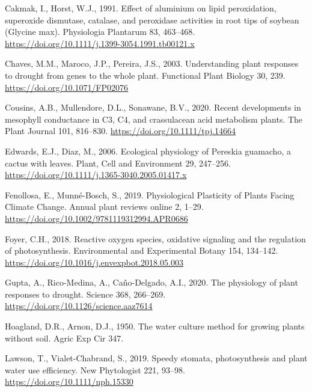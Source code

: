 \documentclass[
  12pt,
  letterpaper,
  DIV=11,
  numbers=noendperiod]{scrartcl}
\newlength{\cslhangindent}
\newlength{\cslentryspacingunit} %
\newenvironment{CSLReferences}[2] %
 {%
  \setlength{\parindent}{0pt}
  \ifodd #1
  \let\oldpar\par
  \def\par{\hangindent=\cslhangindent\oldpar}
  \fi
  \setlength{\parskip}{#2\cslentryspacingunit}
 }%
 {}
\begin{document}
\hypertarget{refs}{}
\begin{CSLReferences}{1}{0}
\leavevmode{}%
Cakmak, I., Horst, W.J., 1991. Effect of aluminium on lipid
peroxidation, superoxide dismutase, catalase, and peroxidase activities
in root tips of soybean ({Glycine} max). Physiologia Plantarum 83,
463--468. \url{https://doi.org/10.1111/j.1399-3054.1991.tb00121.x}

\leavevmode{}%
Chaves, M.M., Maroco, J.P., Pereira, J.S., 2003. Understanding plant
responses to drought \textemdash{} from genes to the whole plant.
Functional Plant Biology 30, 239. \url{https://doi.org/10.1071/FP02076}

\leavevmode{}%
Cousins, A.B., Mullendore, D.L., Sonawane, B.V., 2020. Recent
developments in mesophyll conductance in {C3}, {C4}, and crassulacean
acid metabolism plants. The Plant Journal 101, 816--830.
\url{https://doi.org/10.1111/tpj.14664}

\leavevmode{}%
Edwards, E.J., Diaz, M., 2006. Ecological physiology of {Pereskia}
guamacho, a cactus with leaves. Plant, Cell and Environment 29,
247--256. \url{https://doi.org/10.1111/j.1365-3040.2005.01417.x}

\leavevmode{}%
Fenollosa, E., Munné-Bosch, S., 2019. Physiological {Plasticity} of
{Plants Facing Climate Change}. Annual plant reviews online 2, 1--29.
\url{https://doi.org/10.1002/9781119312994.APR0686}

\leavevmode{}%
Foyer, C.H., 2018. Reactive oxygen species, oxidative signaling and the
regulation of photosynthesis. Environmental and Experimental Botany 154,
134--142. \url{https://doi.org/10.1016/j.envexpbot.2018.05.003}

\leavevmode{}%
Gupta, A., Rico-Medina, A., Caño-Delgado, A.I., 2020. The physiology of
plant responses to drought. Science 368, 266--269.
\url{https://doi.org/10.1126/science.aaz7614}

\leavevmode{}%
Hoagland, D.R., Arnon, D.J., 1950. The water culture method for growing
plants without soil. Agric Exp Cir 347.

\leavevmode{}%
Lawson, T., Vialet-Chabrand, S., 2019. Speedy stomata, photosynthesis
and plant water use efficiency. New Phytologist 221, 93--98.
\url{https://doi.org/10.1111/nph.15330}


\end{CSLReferences}
\end{document}
